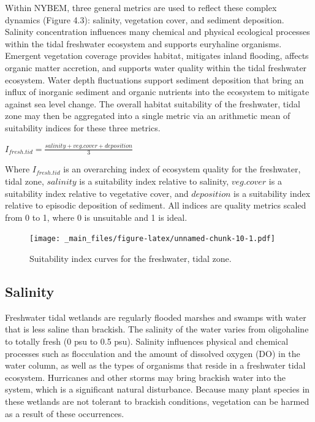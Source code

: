 \documentclass[
]{book}
\begin{document}
Within NYBEM, three general metrics are used to reflect these complex dynamics (Figure 4.3): salinity, vegetation cover, and sediment deposition. Salinity concentration influences many chemical and physical ecological processes within the tidal freshwater ecosystem and supports euryhaline organisms. Emergent vegetation coverage provides habitat, mitigates inland flooding, affects organic matter accretion, and supports water quality within the tidal freshwater ecosystem. Water depth fluctuations support sediment deposition that bring an influx of inorganic sediment and organic nutrients into the ecosystem to mitigate against sea level change. The overall habitat suitability of the freshwater, tidal zone may then be aggregated into a single metric via an arithmetic mean of suitability indices for these three metrics.

\(I_{fresh.tid} = \frac{salinity + veg.cover + deposition}{3}\)

Where \(I_{fresh.tid}\) is an overarching index of ecosystem quality for the freshwater, tidal zone, \(salinity\) is a suitability index relative to salinity, \(veg.cover\) is a suitability index relative to vegetative cover, and \(deposition\) is a suitability index relative to episodic deposition of sediment. All indices are quality metrics scaled from 0 to 1, where 0 is unsuitable and 1 is ideal.

\begin{figure}
\centering
\texttt{[image: \_main\_files/figure-latex/unnamed-chunk-10-1.pdf]}
\caption{\label{fig:unnamed-chunk-10}Suitability index curves for the freshwater, tidal zone.}
\end{figure}

\hypertarget{salinity}{%
\subsection{Salinity}\label{salinity}}

Freshwater tidal wetlands are regularly flooded marshes and swamps with water that is less saline than brackish. The salinity of the water varies from oligohaline to totally fresh (0 psu to 0.5 psu). Salinity influences physical and chemical processes such as flocculation and the amount of dissolved oxygen (DO) in the water column, as well as the types of organisms that reside in a freshwater tidal ecosystem. Hurricanes and other storms may bring brackish water into the system, which is a significant natural disturbance. Because many plant species in these wetlands are not tolerant to brackish conditions, vegetation can be harmed as a result of these occurrences.
\end{document}
